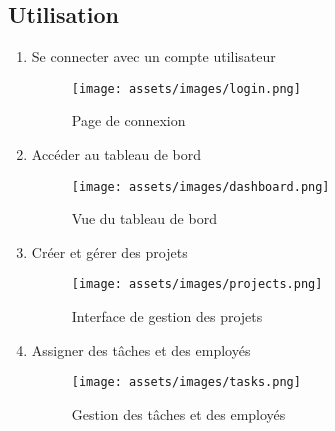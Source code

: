 \documentclass[12pt,a4paper]{article}
\begin{document}
\subsection{Utilisation}
\begin{enumerate}
    \item Se connecter avec un compte utilisateur
    \begin{figure}[h]
        \centering
        \texttt{[image: assets/images/login.png]}
        \caption{Page de connexion}
    \end{figure}

    \item Accéder au tableau de bord
    \begin{figure}[h]
        \centering
        \texttt{[image: assets/images/dashboard.png]}
        \caption{Vue du tableau de bord}
    \end{figure}

    \item Créer et gérer des projets
    \begin{figure}[h]
        \centering
        \texttt{[image: assets/images/projects.png]}
        \caption{Interface de gestion des projets}
    \end{figure}

    \item Assigner des tâches et des employés
    \begin{figure}[h]
        \centering
        \texttt{[image: assets/images/tasks.png]}
        \caption{Gestion des tâches et des employés}
    \end{figure}
\end{enumerate}
\end{document}
